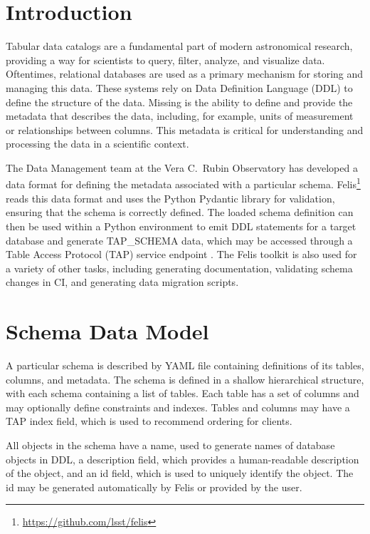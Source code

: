 \documentclass[11pt,twoside]{article}
\begin{document}
\section{Introduction}

Tabular data catalogs are a fundamental part of modern astronomical research, providing a way for scientists to query, filter, analyze, and visualize data.
Oftentimes, relational databases are used as a primary mechanism for storing and managing this data.
These systems rely on Data Definition Language (DDL) to define the structure of the data.
Missing is the ability to define and provide the metadata that describes the data, including, for example, units of measurement or relationships between columns.
This metadata is critical for understanding and processing the data in a scientific context.

The Data Management team at the Vera C.\ Rubin Observatory \citep{2019ApJ...873..111I} has developed a data format for defining the metadata associated with a particular schema.
Felis\footnote{\url{https://github.com/lsst/felis}} reads this data format and uses the Python Pydantic library for validation, ensuring that the schema is correctly defined.
The loaded schema definition can then be used within a Python environment to emit DDL statements for a target database and generate TAP\_SCHEMA data, which may be accessed through a Table Access Protocol (TAP) service endpoint \citep{2019ivoa.spec.0927D}.
The Felis toolkit is also used for a variety of other tasks, including generating documentation, validating schema changes in CI, and generating data migration scripts.

\section{Schema Data Model}


A particular schema is described by YAML file containing definitions of its tables, columns, and metadata.
The schema is defined in a shallow hierarchical structure, with each schema containing a list of tables.
Each table has a set of columns and may optionally define constraints and indexes.
Tables and columns may have a TAP index field, which is used to recommend ordering for clients.

All objects in the schema have a name, used to generate names of database objects in DDL, a description field, which provides a human-readable description of the object, and an id field, which is used to uniquely identify the object.
The id may be generated automatically by Felis or provided by the user.
\end{document}
